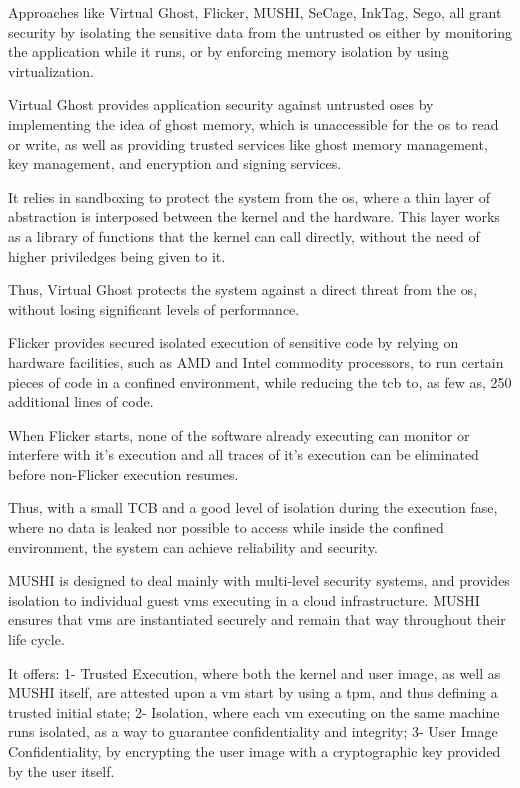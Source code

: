 Approaches like Virtual Ghost, Flicker, MUSHI, SeCage, InkTag, Sego, all grant security by isolating the sensitive data from the untrusted \gls{os} either by monitoring the application while it runs, or by enforcing memory isolation by using virtualization.


Virtual Ghost \cite{virtGhostPaper} provides application security against untrusted \gls{os}es by implementing the idea of ghost memory, which is unaccessible for the \gls{os} to read or write, as well as providing trusted services like ghost memory management, key management, and encryption and signing services. 

It relies in sandboxing to protect the system from the \gls{os}, where a thin layer of abstraction is interposed between the kernel and the hardware. This layer works as a library of functions that the kernel can call directly, without the need of higher priviledges being given to it. 

Thus, Virtual Ghost protects the system against a direct threat from the \gls{os}, without losing significant levels of performance.


Flicker \cite{flickerPaper} provides secured isolated execution of sensitive code by relying on hardware facilities, such as AMD and Intel commodity processors, to run certain pieces of code in a confined environment, while reducing the \gls{tcb} to, as few as, 250 additional lines of code. 

When Flicker starts, none of the software already executing can monitor or interfere with it’s execution and all traces of it’s execution can be eliminated before non-Flicker execution resumes. 

Thus, with a small TCB and a good level of isolation during the execution fase, where no data is leaked nor possible to access while inside the confined environment, the system can achieve reliability and security.


MUSHI \cite{mushiPaper} is designed to deal mainly with multi-level security systems, and provides isolation to individual guest \gls{vm}s executing in a cloud infrastructure. MUSHI ensures that \gls{vm}s are instantiated securely and remain that way throughout their life cycle. 

It offers: 1- Trusted Execution, where both the kernel and user image, as well as MUSHI itself, are attested upon a \gls{vm} start by using a \gls{tpm}, and thus defining a trusted initial state; 2- Isolation, where each \gls{vm} executing on the same machine runs isolated, as a way to guarantee confidentiality and integrity; 3- User Image Confidentiality, by encrypting the user image with a cryptographic key provided by the user itself.

